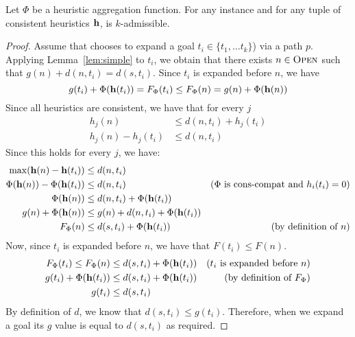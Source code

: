 \begin{theorem}
  \label{thm:consistent}
  Let $\Phi$ be a \axiomcons heuristic aggregation function.
  For any \kgs instance and for any tuple of consistent heuristics $\mathbf{h}$, \kastarphi is $k$-admissible.
\end{theorem}
\begin{proof}
  Assume that \kastar chooses to expand a goal $t_i \in \{t_1, \ldots t_k\}$) via a path $p$. 
  Applying Lemma~\ref{lem:simple} to $t_i$, we obtain that there exists $n\in \textsc{Open}$ such that $g(n) + d(n, t_i) = d(s, t_i)$.
  Since $t_i$ is expanded before $n$, we have 
  \begin{equation}
      g(t_i) + \Phi(\mathbf{h}(t_i)) = F_\Phi(t_i) \leq F_\Phi(n) = g(n) + \Phi(\mathbf{h}(n))
  \end{equation}
    Since all heuristics are consistent, we have that for every $j$
  \begin{align}
    h_j(n)                  & \leq d(n, t_i) + h_j(t_i)   \\
    h_j(n) - h_j(t_i)       & \leq d(n, t_i)               
\end{align}
Since this holds for every $j$, we have: 
\begin{align}
    \max(\vect{h}(n) - \vect{h}(t_i)) & \leq d(n, t_i)      & \\
    \Phi(\vect{h}(n))-\Phi(\vect{h}(t_i))  & \leq d(n, t_i)  & \text{($\Phi$ is \axiomcons and $h_i(t_i) = 0$)}\\
        \Phi(\vect{h}(n))  & \leq d(n, t_i) + \Phi(\vect{h}(t_i)) & \\
    g(n) + \Phi(\vect{h}(n))           & \leq g(n)+ d(n, t_i) + \Phi(\vect{h}(t_i)) & \\
    F_\Phi(n)           & \leq d(s, t_i) + \Phi(\vect{h}(t_i)) &
    \text{(by definition of $n$)}
  \end{align}  
    Now, since $t_i$ is expanded before $n$, we have that $F(t_i) \leq F(n)$. 
  \begin{align}  
    F_\Phi(t_i) \leq F_\Phi(n)                     & \leq d(s, t_i) + \Phi(\mathbf{h}(t_i)) & \text{($t_i$ is expanded before $n$)}\\
    g(t_i) + \Phi(\mathbf{h}(t_i))           & \leq d(s, t_i) + \Phi(\mathbf{h}(t_i)) & \text{(by definition of $F_\Phi$)}\\
    g(t_i)                & \leq d(s, t_i) & 
    \label{eq:consistent}
  \end{align}
  By definition of $d$, we know that $d(s,t_i)\leq g(t_i)$. Therefore, when we expand a goal its $g$ value is equal to $d(s, t_i)$ as required.
\end{proof}

